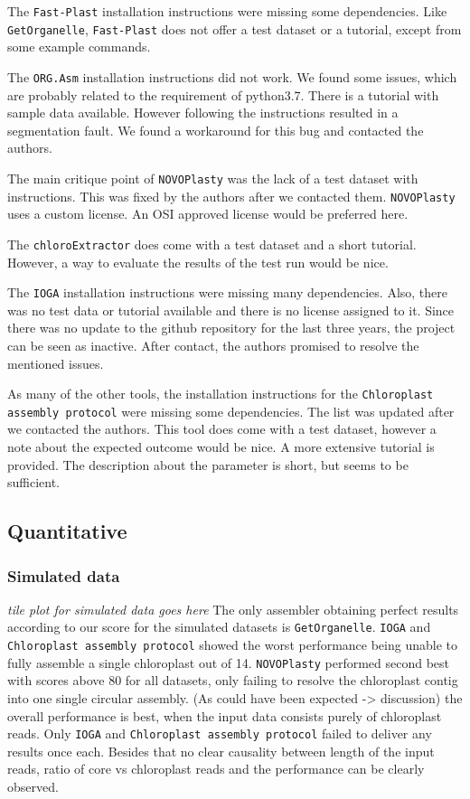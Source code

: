 \documentclass{bmcart}
\newcommand{\formatprogramnames}[1]{\texttt{#1}}
\newcommand{\ce}{\formatprogramnames{chloroExtractor}}
\newcommand{\oa}{\formatprogramnames{ORG.Asm}}
\newcommand{\fp}{\formatprogramnames{Fast-Plast}}
\newcommand{\ioga}{\formatprogramnames{IOGA}}
\newcommand{\np}{\formatprogramnames{NOVOPlasty}}
\newcommand{\go}{\formatprogramnames{GetOrganelle}}
\newcommand{\cassp}{\formatprogramnames{Chloroplast assembly protocol}}
\begin{document}
The \fp{} installation instructions were missing some dependencies. Like \go{}, \fp{} does not offer a test dataset or a tutorial, except from some example commands. 

The \oa{} installation instructions did not work. We found some issues, which are probably related to the requirement of python3.7. There is a tutorial with sample data available. However following the instructions resulted in a segmentation fault. We found a workaround for this bug and contacted the authors.

The main critique point of \np{} was the lack of a test dataset with instructions. This was fixed by the authors after we contacted them. \np{} uses a custom license. An OSI approved license would be preferred here.

The \ce{} does come with a test dataset and a short tutorial. However, a way to evaluate the results of the test run would be nice.

The \ioga{} installation instructions were missing many dependencies. Also, there was no test data or tutorial available and there is no license assigned to it. Since there was no update to the github repository for the last three years, the project can be seen as inactive. After contact, the authors promised to resolve the mentioned issues.

As many of the other tools, the installation instructions for the \cassp{} were missing some dependencies. The list was updated after we contacted the authors. This tool does come with a test dataset, however a note about the expected outcome would be nice. A more extensive tutorial is provided. The description about the parameter is short, but seems to be sufficient.

\subsection*{Quantitative}
\subsubsection*{Simulated data}
\textit{tile plot for simulated data goes here}
The only assembler obtaining perfect results according to our score for the simulated datasets is \go{}.
\ioga{} and \cassp{} showed the worst performance being unable to fully assemble a single chloroplast out of 14.
\np{} performed second best with scores above 80 for all datasets, only failing to resolve the chloroplast contig into one single circular assembly.
(As could have been expected -> discussion) the overall performance is best, when the input data consists purely of chloroplast reads.
Only \ioga{} and \cassp{} failed to deliver any results once each.
Besides that no clear causality between length of the input reads, ratio of core vs chloroplast reads and the performance can be clearly observed. 
\end{document}
